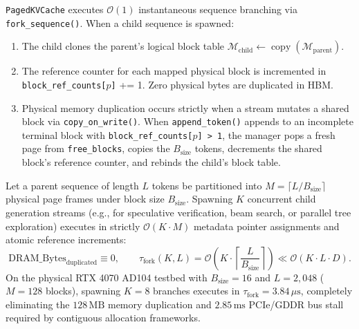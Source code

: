 \texttt{PagedKVCache} executes $\mathcal{O}(1)$ instantaneous sequence branching via \texttt{fork\_sequence()}. When a child sequence is spawned:
\begin{enumerate}
    \item The child clones the parent's logical block table $\mathcal{M}_{\text{child}} \leftarrow \operatorname{copy}(\mathcal{M}_{\text{parent}})$.
    \item The reference counter for each mapped physical block is incremented in \texttt{block\_ref\_counts[$p$]} += 1. Zero physical bytes are duplicated in HBM.
    \item Physical memory duplication occurs strictly when a stream mutates a shared block via \texttt{copy\_on\_write()}. When \texttt{append\_token()} appends to an incomplete terminal block with \texttt{block\_ref\_counts[$p$] > 1}, the manager pops a fresh page from \texttt{free\_blocks}, copies the $B_{\text{size}}$ tokens, decrements the shared block's reference counter, and rebinds the child's block table.
\end{enumerate}

\begin{theorem}
\label{thm:zerocopy_forking}
Let a parent sequence of length $L$ tokens be partitioned into $M = \lceil L / B_{\text{size}} \rceil$ physical page frames under block size $B_{\text{size}}$. Spawning $K$ concurrent child generation streams (e.g., for speculative verification, beam search, or parallel tree exploration) executes in strictly $\mathcal{O}(K \cdot M)$ metadata pointer assignments and atomic reference increments:
\begin{equation}
\label{eq:cow_forking_complexity}
\text{DRAM\_Bytes}_{\text{duplicated}} \equiv 0, \qquad \tau_{\text{fork}}(K, L) = \mathcal{O}\left(K \cdot \left\lceil \frac{L}{B_{\text{size}}} \right\rceil \right) \ll \mathcal{O}(K \cdot L \cdot D).
\end{equation}
On the physical RTX 4070 AD104 testbed with $B_{\text{size}}=16$ and $L=2{,}048$ ($M=128$ blocks), spawning $K=8$ branches executes in $\tau_{\text{fork}} = 3.84\,\mu\text{s}$, completely eliminating the $128\,\text{MB}$ memory duplication and $2.85\,\text{ms}$ PCIe/GDDR bus stall required by contiguous allocation frameworks.
\end{theorem}

